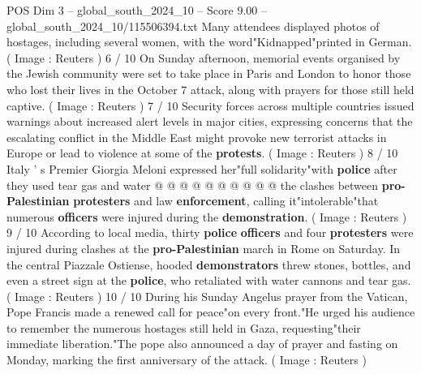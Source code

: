 \begin{textsample}{POS Dim 3 – global\_south\_2024\_10 – Score 9.00 – global\_south\_2024\_10/115506394.txt}
Many attendees displayed photos of hostages, including several women, with the word"Kidnapped"printed in German. ( Image : Reuters ) 6 / 10 On Sunday afternoon, memorial events organised by the Jewish community were set to take place in Paris and London to honor those who lost their lives in the October 7 attack, along with prayers for those still held captive. ( Image : Reuters ) 7 / 10 Security forces across multiple countries issued warnings about increased alert levels in major cities, expressing concerns that the escalating conflict in the Middle East might provoke new terrorist attacks in Europe or lead to violence at some of the \textbf{protests}. ( Image : Reuters ) 8 / 10 Italy ' s Premier Giorgia Meloni expressed her"full solidarity"with \textbf{police} after they used tear gas and water @ @ @ @ @ @ @ @ @ @ the clashes between \textbf{pro-Palestinian} \textbf{protesters} and law \textbf{enforcement}, calling it"intolerable"that numerous \textbf{officers} were injured during the \textbf{demonstration}. ( Image : Reuters ) 9 / 10 According to local media, thirty \textbf{police} \textbf{officers} and four \textbf{protesters} were injured during clashes at the \textbf{pro-Palestinian} march in Rome on Saturday.
In the central Piazzale Ostiense, hooded \textbf{demonstrators} threw stones, bottles, and even a street sign at the \textbf{police}, who retaliated with water cannons and tear gas. ( Image : Reuters ) 10 / 10 During his Sunday Angelus prayer from the Vatican, Pope Francis made a renewed call for peace"on every front."He urged his audience to remember the numerous hostages still held in Gaza, requesting"their immediate liberation."The pope also announced a day of prayer and fasting on Monday, marking the first anniversary of the attack. ( Image : Reuters )

\end{textsample}
